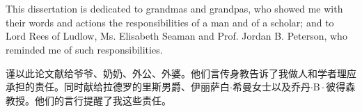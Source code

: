 ﻿\chapter*{}
This dissertation is dedicated to grandmas and grandpas, who showed me with their words and actions the responsibilities of a man and of a scholar; and to Lord Rees of Ludlow, Ms. Elisabeth Seaman and Prof. Jordan B. Peterson, who reminded me of such responsibilities.\\

\begin{CJK*}{UTF8}{gkai}
谨以此论文献给爷爷、奶奶、外公、外婆。他们言传身教告诉了我做人和学者理应承担的责任。同时献给拉德罗的里斯男爵、伊丽萨白$\cdot$希曼女士以及乔丹$\cdot\mathrm{B}\cdot$彼得森教授。他们的言行提醒了我这些责任。
\end{CJK*}